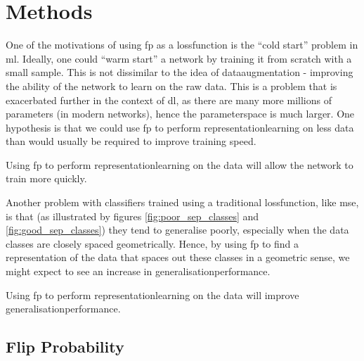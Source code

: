 \chapter{Methods}

One of the motivations of using \gls{fp} as a \gls{lossfunction} is the \enquote{cold start} problem in \gls{ml}. Ideally, one could \enquote{warm start} a network by training it from scratch with a small sample. This is not dissimilar to the idea of \gls{dataaugmentation} - improving the ability of the network to learn on the raw data. This is a problem that is exacerbated further in the context of \gls{dl}, as there are many more millions of parameters (in modern networks), hence the \gls{parameterspace} is much larger. One hypothesis is that we could use \gls{fp} to perform \gls{representationlearning} on less data than would usually be required to improve training speed.

\begin{hypothesis} %
Using \gls{fp} to perform \gls{representationlearning} on the data will allow the network to train more quickly.
\label{hyp:first}
\end{hypothesis}

Another problem with classifiers trained using a traditional \gls{lossfunction}, like \gls{mse}, is that (as illustrated by figures \ref{fig:poor_sep_classes} and \ref{fig:good_sep_classes}) they tend to generalise poorly, especially when the data classes are closely spaced geometrically. Hence, by using \gls{fp} to find a representation of the data that spaces out these classes in a geometric sense, we might expect to see an increase in \gls{generalisationperformance}.

\begin{hypothesis} %
Using \gls{fp} to perform \gls{representationlearning} on the data will improve \gls{generalisationperformance}.
\label{hyp:second}
\end{hypothesis}


\section{Flip Probability}

